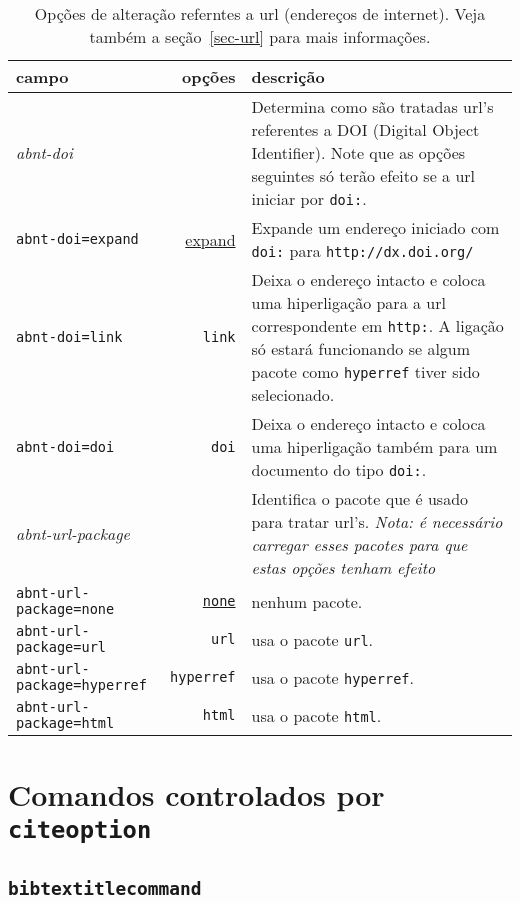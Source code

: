 \documentclass[espacosimples]{abnt}
\begin{document}
\begin{table}[htbp]
\begin{center}
\begin{tabular}{lrp{8cm}}\hline\hline
campo & opções & descrição \\ \hline
\emph{abnt-doi} & & Determina como são tratadas url's referentes a DOI
(Digital Object Identifier)\cite{DOI}. Note que as opções seguintes
só terão efeito se a url iniciar por {\tt doi:}.\\
{\tt abnt-doi=expand} & \underline{expand} &
Expande um endereço iniciado com {\tt doi:} para
{\tt http://dx.doi.org/}\\
{\tt abnt-doi=link} & {\tt link} & Deixa o endereço intacto e coloca uma hiperligação
para a url correspondente em {\tt http:}. A ligação só estará funcionando
se algum pacote como {\tt hyperref} tiver sido selecionado.\\
{\tt abnt-doi=doi} & {\tt doi} & Deixa o endereço intacto e coloca uma hiperligação
também para um documento do tipo {\tt doi:}.\\ \hline
\emph{abnt-url-package} & & Identifica o pacote que é usado para tratar url's.
\emph{Nota: é necessário carregar esses pacotes para que estas opções tenham
efeito}\\
{\tt abnt-url-package=none} &\underline{\tt none} & nenhum pacote.\\
{\tt abnt-url-package=url} & {\tt url} & usa o pacote {\tt url}.\\
{\tt abnt-url-package=hyperref} & {\tt hyperref} & usa o pacote {\tt hyperref}.\\
{\tt abnt-url-package=html} & {\tt html} & usa o pacote {\tt html}.\\
\hline\hline
\end{tabular}
\end{center}
\caption[Opções de alteração dos estilos bibliográficos: url]{
Opções de alteração referntes a url (endereços de internet).
Veja também a seção~\protect\ref{sec-url} para mais informações.}
\label{tabela-opcoes-url}
\end{table}

\section{Comandos controlados por {\tt citeoption}}

\subsection{{\tt bibtextitlecommand}}
\label{sec-titlecommand}
\end{document}
